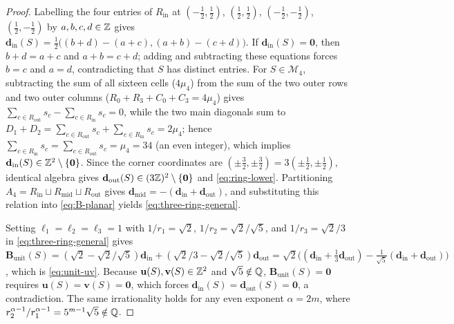 \begin{proof}
Labelling the four entries of $R_{\mathrm{in}}$ at $(-\frac12,\frac12)$, $(\frac12,\frac12)$, $(-\frac12,-\frac12)$, $(\frac12,-\frac12)$ by $a,b,c,d\in\mathbb{Z}$ gives $\mathbf d_{\mathrm{in}}(S)=\frac12\bigl((b+d)-(a+c),(a+b)-(c+d)\bigr)$. If $\mathbf d_{\mathrm{in}}(S)=\mathbf 0$, then $b+d=a+c$ and $a+b=c+d$; adding and subtracting these equations forces $b=c$ and $a=d$, contradicting that $S$ has distinct entries. For $S\in\mathcal M_4$, subtracting the sum of all sixteen cells ($4\mu_4$) from the sum of the two outer rows and two outer columns ($R_0+R_3+C_0+C_3=4\mu_4$) gives $\sum_{c\in R_{\mathrm{out}}}s_c-\sum_{c\in R_{\mathrm{in}}}s_c=0$, while the two main diagonals sum to $D_1+D_2=\sum_{c\in R_{\mathrm{out}}}s_c+\sum_{c\in R_{\mathrm{in}}}s_c=2\mu_4$; hence $\sum_{c\in R_{\mathrm{in}}}s_c=\sum_{c\in R_{\mathrm{out}}}s_c=\mu_4=34$ (an even integer), which implies $\mathbf d_{\mathrm{in}}(S)\in\mathbb{Z}^2\setminus\{\mathbf 0\}$. Since the corner coordinates are $(\pm\frac32,\pm\frac32)=3(\pm\frac12,\pm\frac12)$, identical algebra gives $\mathbf d_{\mathrm{out}}(S)\in(3\mathbb{Z})^2\setminus\{\mathbf 0\}$ and \eqref{eq:ring-lower}. Partitioning $A_4=R_{\mathrm{in}}\sqcup R_{\mathrm{mid}}\sqcup R_{\mathrm{out}}$ gives $\mathbf d_{\mathrm{mid}}=-(\mathbf d_{\mathrm{in}}+\mathbf d_{\mathrm{out}})$, and substituting this relation into \eqref{eq:B-planar} yields \eqref{eq:three-ring-general}.

Setting $\ell_1=\ell_2=\ell_3=1$ with $1/r_1=\sqrt{2}$, $1/r_2=\sqrt{2}/\sqrt{5}$, and $1/r_3=\sqrt{2}/3$ in \eqref{eq:three-ring-general} gives $\mathbf B_{\mathrm{unit}}(S)=(\sqrt{2}-\sqrt{2}/\sqrt{5})\mathbf d_{\mathrm{in}}+(\sqrt{2}/3-\sqrt{2}/\sqrt{5})\mathbf d_{\mathrm{out}}=\sqrt{2}\bigl((\mathbf d_{\mathrm{in}}+\frac13\mathbf d_{\mathrm{out}})-\frac{1}{\sqrt{5}}(\mathbf d_{\mathrm{in}}+\mathbf d_{\mathrm{out}})\bigr)$, which is \eqref{eq:unit-uv}. Because $\mathbf u(S),\mathbf v(S)\in\mathbb{Z}^2$ and $\sqrt{5}\notin\mathbb{Q}$, $\mathbf B_{\mathrm{unit}}(S)=\mathbf 0$ requires $\mathbf u(S)=\mathbf v(S)=\mathbf 0$, which forces $\mathbf d_{\mathrm{in}}(S)=\mathbf d_{\mathrm{out}}(S)=\mathbf 0$, a contradiction. The same irrationality holds for any even exponent $\alpha=2m$, where $r_2^{\alpha-1}/r_1^{\alpha-1}=5^{m-1}\sqrt{5}\notin\mathbb{Q}$.


\end{proof}
